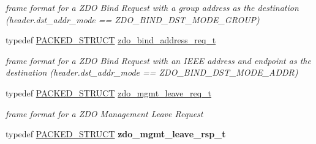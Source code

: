 \begin{DoxyCompactItemize}
\begin{DoxyCompactList}\small\item\em frame format for a Z\+DO Bind Request with a group address as the destination (header.\+dst\+\_\+addr\+\_\+mode == Z\+D\+O\+\_\+\+B\+I\+N\+D\+\_\+\+D\+S\+T\+\_\+\+M\+O\+D\+E\+\_\+\+G\+R\+O\+UP) \end{DoxyCompactList}\item 
typedef \hyperlink{group___s_x_a_ga4233297bd31be5c273d4fb0758cc54d7}{P\+A\+C\+K\+E\+D\+\_\+\+S\+T\+R\+U\+CT} \hyperlink{group__zdo_ga68c283a043714a9e40d3674146dd6239}{zdo\+\_\+bind\+\_\+address\+\_\+req\+\_\+t}
\begin{DoxyCompactList}\small\item\em frame format for a Z\+DO Bind Request with an I\+E\+EE address and endpoint as the destination (header.\+dst\+\_\+addr\+\_\+mode == Z\+D\+O\+\_\+\+B\+I\+N\+D\+\_\+\+D\+S\+T\+\_\+\+M\+O\+D\+E\+\_\+\+A\+D\+DR) \end{DoxyCompactList}\item 
typedef \hyperlink{group___s_x_a_ga4233297bd31be5c273d4fb0758cc54d7}{P\+A\+C\+K\+E\+D\+\_\+\+S\+T\+R\+U\+CT} \hyperlink{group__zdo_gaa7b8baffae72af214b453440e763da1e}{zdo\+\_\+mgmt\+\_\+leave\+\_\+req\+\_\+t}
\begin{DoxyCompactList}\small\item\em frame format for a Z\+DO Management Leave Request \end{DoxyCompactList}\item 
typedef \hyperlink{group___s_x_a_ga4233297bd31be5c273d4fb0758cc54d7}{P\+A\+C\+K\+E\+D\+\_\+\+S\+T\+R\+U\+CT} {\bfseries zdo\+\_\+mgmt\+\_\+leave\+\_\+rsp\+\_\+t}
\end{DoxyCompactItemize}
